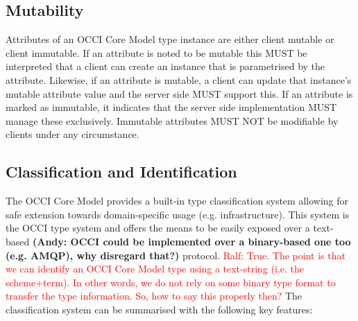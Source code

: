 \documentclass[10pt,a4paper]{article}
\newcommand{\ralf}[1]{\textcolor{red}{Ralf: #1}}
\begin{document}
\subsection{Mutability}

Attributes of an OCCI Core Model type instance are
either client mutable or client immutable. If an attribute is noted to
be mutable this MUST be interpreted that a client can create an
instance that is parametrised by the attribute. Likewise, if
an attribute is mutable, a client can update that instance's
mutable attribute value and the server side MUST support this. If an
attribute is marked as immutable, it indicates that the server side
implementation MUST manage these exclusively. Immutable attributes
MUST NOT be modifiable by clients under any circumstance.

\subsection{Classification and Identification}
\label{sec:classification}
The OCCI Core Model provides a built-in type classification system allowing for safe
extension towards domain-specific usage (e.g. infrastructure). This system is the OCCI type system
and offers the means to be easily exposed over a text-based 
\textbf{(Andy: OCCI could be implemented over a binary-based one too (e.g. AMQP), why disregard that?)} protocol.
\ralf{True. The point is that we can identify an OCCI Core Model type using a text-string (i.e. the scheme+term). In other words, we do not rely on some binary type format to transfer the type information. So, how to say this properly then?}
%
The classification system can be summarised with the following key features:
\end{document}
